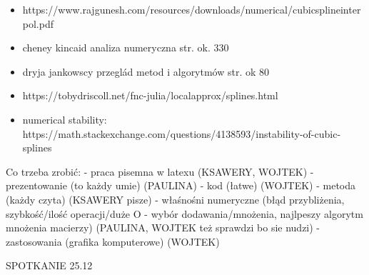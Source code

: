 \documentclass{article}
\begin{document}
\newpage






\begin{itemize}
    \item https://www.rajgunesh.com/resources/downloads/numerical/cubicsplineinterpol.pdf
    \item cheney kincaid analiza numeryczna str. ok. 330 
    \item dryja jankowscy przeglád metod i algorytmów str. ok 80
    \item https://tobydriscoll.net/fnc-julia/localapprox/splines.html
    \item numerical stability: https://math.stackexchange.com/questions/4138593/instability-of-cubic-splines
\end{itemize}



Co trzeba zrobić:
- praca pisemna w latexu (KSAWERY, WOJTEK)
- prezentowanie (to każdy umie) (PAULINA)
- kod (łatwe) (WOJTEK)
- metoda (każdy czyta) (KSAWERY pisze)
- właśnośni numeryczne (błąd przybliżenia, szybkość/ilość operacji/duże O - wybór dodawania/mnożenia, najlpeszy algorytm mnożenia macierzy) (PAULINA, WOJTEK też sprawdzi bo sie nudzi)
- zastosowania (grafika komputerowe) (WOJTEK)

SPOTKANIE 25.12
\end{document}
